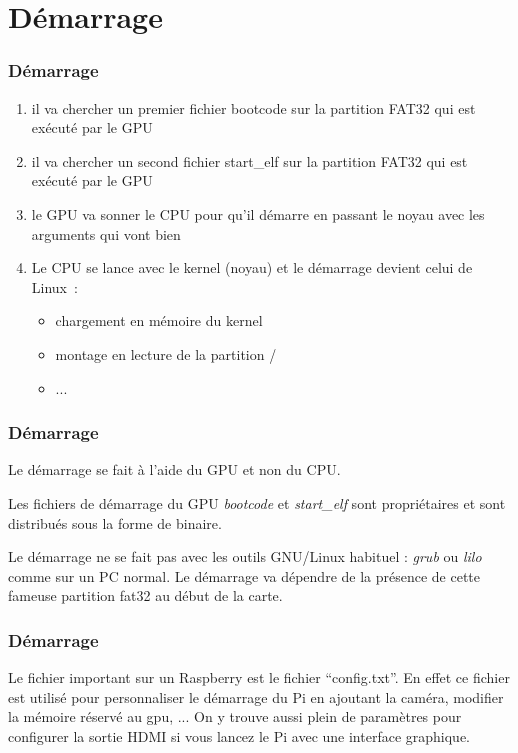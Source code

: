 \section{Démarrage}

\begin{frame}[containsverbatim]
\frametitle{Démarrage}

\begin{enumerate}
	\item il va chercher un premier fichier bootcode sur la partition FAT32 qui est exécuté par le GPU
	\item il va chercher un second fichier start\_elf sur la partition FAT32 qui est exécuté par le GPU
	\item le GPU va sonner le CPU pour qu'il démarre en passant le noyau avec les arguments qui vont bien
	\item Le CPU se lance avec le kernel (noyau) et le démarrage devient celui de Linux~:
		\begin{itemize}
			\item chargement en mémoire du kernel
			\item montage en lecture de la partition /
			\item ...
		\end{itemize}
\end{enumerate}

\end{frame}

\begin{frame}[containsverbatim]
\frametitle{Démarrage}

Le démarrage se fait à l'aide du GPU et non du CPU.

Les fichiers de démarrage du GPU \emph{bootcode} et \emph{start\_elf} sont propriétaires et sont distribués sous la forme de binaire.

Le démarrage ne se fait pas avec les outils GNU/Linux habituel : \emph{grub} ou \emph{lilo} comme sur un PC normal. Le démarrage va dépendre de la présence de cette fameuse partition fat32 au début de la carte. 

\end{frame}

\begin{frame}[containsverbatim]
\frametitle{Démarrage}
Le fichier important sur un Raspberry est le fichier ``config.txt''. En effet ce fichier est utilisé pour personnaliser le démarrage du Pi en ajoutant la caméra, modifier la mémoire réservé au gpu, ... On y trouve aussi plein de paramètres pour configurer la sortie HDMI si vous lancez le Pi avec une interface graphique.

\end{frame}


